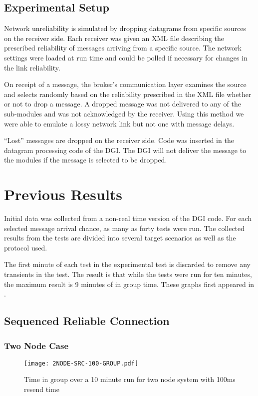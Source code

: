 \subsection{Experimental Setup}
Network unreliability is simulated by dropping datagrams from specific sources
on the receiver side. Each receiver was given an XML file describing the
prescribed reliability of messages arriving from a specific source. The
network settings were loaded at run time and could be polled if necessary for
changes in the link reliability.

On receipt of a message, the broker's communication layer examines the source
and selects randomly based on the reliability prescribed in the XML file whether
or not to drop a message. A dropped message was not delivered to any of the
sub-modules and was not acknowledged by the receiver. Using this method we were 
able to emulate a lossy network link but not one with message delays.

``Lost'' messages are dropped on the receiver side. Code was inserted in the
datagram processing code of the DGI. The DGI will not deliver the message to
the modules if the message is selected to be dropped.

\section{Previous Results}
Initial data was collected from a non-real time version of the DGI code.
For each selected message arrival chance, as many as forty tests were run.
The collected results from the tests are divided into several target scenarios
as well as the protocol used.

The first minute of each test in the experimental test is discarded to remove
any transients in the test. The result is that while the tests were run for
ten minutes, the maximum result is 9 minutes of in group time. These graphs
first appeared in \cite{CRITIS2012}.

\subsection{Sequenced Reliable Connection}

\subsubsection{Two Node Case}

\begin{figure}[!h]
\centering
\texttt{[image: 2NODE-SRC-100-GROUP.pdf]}
\caption{Time in group over a 10 minute run for two node system with 100ms resend time}
\label{fig:IGT-SRC-2NODE-100}
\end{figure}

